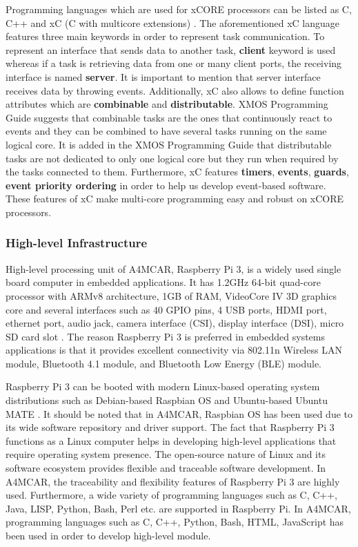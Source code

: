 Programming languages which are used for xCORE processors can be listed as C, C++ and xC (C with multicore extensions) \cite{xmosdatasheet}. The aforementioned xC language features three main keywords in order to represent task communication. To represent an interface that sends data to another task, \textbf{client} keyword is used whereas if a task is retrieving data from one or many client ports, the receiving interface is named \textbf{server}. It is important to mention that server interface receives data by throwing events. Additionally, xC also allows to define function attributes which are \textbf{combinable} and \textbf{distributable}. XMOS Programming Guide \cite{xmosprogrguide} suggests that combinable tasks are the ones that continuously react to events and they can be combined to have several tasks running on the same logical core. It is added in the XMOS Programming Guide \cite{xmosprogrguide} that distributable tasks are not dedicated to only one logical core but they run when required by the tasks connected to them. Furthermore, xC features \textbf{timers}, \textbf{events}, \textbf{guards}, \textbf{event priority ordering} in order to help us develop event-based software. These features of xC make multi-core programming easy and robust on xCORE processors.

\subsubsection{High-level Infrastructure}
High-level processing unit of A4MCAR, Raspberry Pi 3, is a widely used single board computer in embedded applications. It has 1.2GHz 64-bit quad-core processor with ARMv8 architecture, 1GB of RAM, VideoCore IV 3D graphics core and several interfaces such as 40 GPIO pins, 4 USB ports, HDMI port, ethernet port, audio jack, camera interface (CSI), display interface (DSI), micro SD card slot \cite{raspberrypiinfo}. The reason Raspberry Pi 3 is preferred in embedded systems applications is that it provides excellent connectivity via 802.11n Wireless LAN module, Bluetooth 4.1 module, and Bluetooth Low Energy (BLE) module. 

Raspberry Pi 3 can be booted with modern Linux-based operating system distributions such as Debian-based Raspbian OS \cite{raspbiandownload} and Ubuntu-based Ubuntu MATE\cite{ubuntumatedownload} \cite{raspberrypiinfo}. It should be noted that in A4MCAR, Raspbian OS has been used due to its wide software repository and driver support. The fact that Raspberry Pi 3 functions as a Linux computer helps in developing high-level applications that require operating system presence. The open-source nature of Linux and its software ecosystem provides flexible and traceable software development. In A4MCAR, the traceability and flexibility features of Raspberry Pi 3 are highly used. Furthermore, a wide variety of programming languages such as C, C++, Java, LISP, Python, Bash, Perl etc. are supported in Raspberry Pi. In A4MCAR, programming languages such as C, C++, Python, Bash, HTML, JavaScript has been used in order to develop high-level module.

